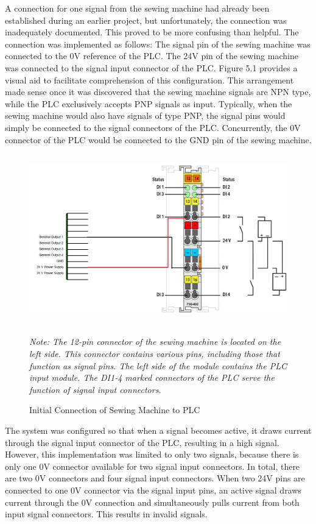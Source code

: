 A connection for one signal from the sewing machine had already been established during an earlier project, but unfortunately, the connection was inadequately documented. This proved to be more confusing than helpful. The connection was implemented as follows: The signal pin of the sewing machine was connected to the 0V reference of the PLC. The 24V pin of the sewing machine was connected to the signal input connector of the PLC. Figure 5.1 provides a visual aid to facilitate comprehension of this configuration. This arrangement made sense once it was discovered that the sewing machine signals are NPN type, while the PLC exclusively accepts PNP signals as input. Typically, when the sewing machine would also have signals of type PNP, the signal pins would simply be connected to the signal connectors of the PLC. Concurrently, the 0V connector of the PLC would be connected to the GND pin of the sewing machine.
\begin{figure}[H]
	\includegraphics[height=7.4cm]{pic/sewing-machine-plc-init.png}
	\caption{Initial Connection of Sewing Machine to PLC}
	\label{fig:Model-Component-Pattern}
	\small\textit{Note: The 12-pin connector of the sewing machine is located on the left side. This connector contains various pins, including those that function as signal pins. The left side of the module contains the PLC input module. The DI1-4 marked connectors of the PLC serve the function of signal input connectors.}
\end{figure}
The system was configured so that when a signal becomes active, it draws current through the signal input connector of the PLC, resulting in a high signal. However, this implementation was limited to only two signals, because there is only one 0V connector available for two signal input connectors. In total, there are two 0V connectors and four signal input connectors. When two 24V pins are connected to one 0V connector via the signal input pins, an active signal draws current through the 0V connection and simultaneously pulls current from both input signal connectors. This results in invalid signals. 


